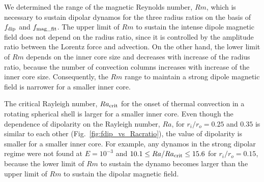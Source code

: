We determined the range of the magnetic Reynolds number, $Rm$, which is necessary to sustain dipolar dynamos for the three radius ratios on the basis of $f_{\rm dip}$ and $f_{\rm mag\_fit}$.
The upper limit of $Rm$ to sustain the intense dipole magnetic field does not depend on the radius ratio, since it is controlled by the amplitude ratio between the Lorentz force and advection. 
On the other hand, the lower limit of $Rm$ depends on the inner core size and decreases with increase of the radius ratio, because the number of convection columns increases with increase of the inner core size. 
Consequently, 
the $Rm$ range to maintain a strong dipole magnetic field is narrower for a smaller inner core.

The critical Rayleigh number, $Ra_{\rm crit}$ for the onset of thermal convection in a rotating spherical shell is larger for a smaller inner core.
Even though the dependence of dipolarity on the Rayleigh number, $Ra$, for $r_i / r_o = 0.25$ and $0.35$ is similar to each other (Fig.~\ref{fig:fdip_vs_Racratio}), the value of dipolarity is smaller for a smaller inner core.
For example, any dynamos in the strong dipolar regime were not found at $E = 10^{-3}$ and $10.1 \le Ra / Ra_{\rm crit} \le 15.6$ for $r_i / r_o = 0.15$, 
because the lower limit of $Rm$ to sustain the dynamo becomes larger than the upper limit of $Rm$ to sustain the dipolar magnetic field. 


